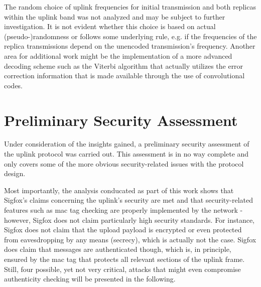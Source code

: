 The random choice of uplink frequencies for initial transmission and both replicas within the uplink band was not analyzed and may be subject to further investigation.
It is not evident whether this choice is based on actual (pseudo-)randomness or follows some underlying rule, e.g. if the frequencies of the replica transmissions depend on the unencoded transmission's frequency.
Another area for additional work might be the implementation of a more advanced decoding scheme such as the Viterbi algorithm that actually utilizes the error correction information that is made available through the use of convolutional codes.

\FloatBarrier
\section{Preliminary Security Assessment}
\label{sec:uplink_security}
Under consideration of the insights gained, a preliminary security assessment of the uplink protocol was carried out.
This assessment is in no way complete and only covers some of the more obvious security-related issues with the protocol design.

Most importantly, the analysis conducated as part of this work shows that Sigfox's claims concerning the uplink's security are met and that security-related features such as \gls{mac} tag checking are properly implemented by the network - however, Sigfox does not claim particularly high security standards.
For instance, Sigfox does not claim that the upload payload is encrypted or even protected from eavesdropping by any means (secrecy), which is actually not the case.
Sigfox does claim \cite[Section 5.1.2]{sigfox_tech} that messages are authenticated though, which is, in principle, ensured by the \gls{mac} tag that protects all relevant sections of the uplink frame.
Still, four possible, yet not very critical, attacks that might even compromise authenticity checking will be presented in the following.

